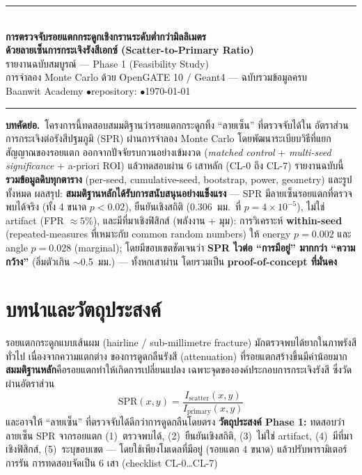 \documentclass[14pt]{extarticle}
\newcommand{\code}[1]{{\ttfamily\detokenize{#1}}}
\begin{document}
\begin{center}
{\color{theme}\rule{\linewidth}{2.5pt}}\\[8pt]
{\LARGE\bfseries\color{themeD} การตรวจจับรอยแตกกระดูกเชิงกรานระดับต่ำกว่ามิลลิเมตร\\[3pt]
ด้วยลายเซ็นการกระเจิงรังสีเอกซ์ (Scatter-to-Primary Ratio)}\\[8pt]
{\Large\color{theme} รายงานฉบับสมบูรณ์ --- Phase 1 (Feasibility Study)}\\[6pt]
{\large การจำลอง Monte Carlo ด้วย OpenGATE 10 / Geant4 --- ฉบับรวมข้อมูลครบ}\\[4pt]
{\small Baanwit Academy \quad$\bullet$\quad repository: \code{intraprasart/GATE-Xray-pelvis-SPR} \quad$\bullet$\quad \today}\\[6pt]
{\color{theme}\rule{\linewidth}{2.5pt}}
\end{center}
\vspace{6pt}

\begin{keybox}
\textbf{\color{themeD} บทคัดย่อ.}\ โครงการนี้ทดสอบสมมติฐานว่ารอยแตกกระดูกทิ้ง ``ลายเซ็น'' ที่ตรวจจับได้ใน
อัตราส่วนการกระเจิงต่อรังสีปฐมภูมิ (SPR) ผ่านการจำลอง Monte Carlo โดยพัฒนาระเบียบวิธีที่แยกสัญญาณของรอยแตก
ออกจากปัจจัยรบกวนอย่างเข้มงวด (\textit{matched control} + \textit{multi-seed significance} + a-priori ROI)
แล้วทดสอบผ่าน 6 เสาหลัก (CL-0 ถึง CL-7) รายงานฉบับนี้\textbf{รวมข้อมูลดิบทุกตาราง} (per-seed, cumulative-seed,
bootstrap, power, geometry) และรูปทั้งหมด ผลสรุป: \textbf{สมมติฐานหลักได้รับการสนับสนุนอย่างแข็งแรง} ---
SPR มีลายเซ็นรอยแตกที่ตรวจพบได้จริง (ทั้ง 4 ขนาด $p<0.02$), ยืนยันเชิงสถิติ (0.306~มม.\ ที่ $p=4\times10^{-5}$),
ไม่ใช่ artifact (FPR $\approx5\%$), และมีที่มาเชิงฟิสิกส์ (พลังงาน + มุม): การวิเคราะห์ \textbf{within-seed}
(repeated-measures ที่เหมาะกับ common random numbers) ให้ energy $p=0.002$ และ angle $p=0.028$ (marginal);
โดยมีขอบเขตชัดเจนว่า \textbf{SPR ไวต่อ ``การมีอยู่'' มากกว่า ``ความกว้าง''} (อิ่มตัวเกิน $\sim$0.5~มม.) ---
ทั้งหกเสาผ่าน โดยรวมเป็น \textbf{proof-of-concept ที่มั่นคง}
\end{keybox}

{\small\tableofcontents}
\clearpage

\section{บทนำและวัตถุประสงค์}
รอยแตกกระดูกแบบเส้นผม (hairline / sub-millimetre fracture) มักตรวจพบได้ยากในภาพรังสีทั่วไป เนื่องจากความแตกต่าง
ของการดูดกลืนรังสี (attenuation) ที่รอยแตกสร้างขึ้นมีค่าน้อยมาก \textbf{สมมติฐานหลัก}คือรอยแตกทำให้เกิดการเปลี่ยนแปลง
เฉพาะจุดขององค์ประกอบการกระเจิงรังสี ซึ่งวัดผ่านอัตราส่วน
\[ \mathrm{SPR}(x,y)=\frac{I_{\text{scatter}}(x,y)}{I_{\text{primary}}(x,y)} \]
และอาจให้ ``ลายเซ็น'' ที่ตรวจจับได้ดีกว่าการดูดกลืนโดยตรง \textbf{วัตถุประสงค์ Phase 1:} ทดสอบว่าลายเซ็น SPR
จากรอยแตก (1)~ตรวจพบได้, (2)~ยืนยันเชิงสถิติ, (3)~ไม่ใช่ artifact, (4)~มีที่มาเชิงฟิสิกส์, (5)~ระบุขอบเขต ---
โดยใช้เพียงโมเดลที่มีอยู่ (รอยแตก 4 ขนาด) แล้วปรับพารามิเตอร์การรัน การทดสอบจัดเป็น 6 เสา (checklist CL-0…CL-7)
\end{document}
